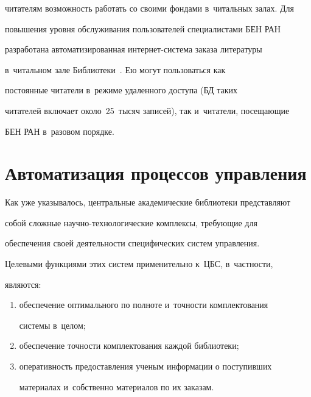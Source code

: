 читателям возможность работать со своими фондами в~читальных залах. Для 


повышения уровня обслуживания пользователей специалистами БЕН РАН 


разработана автоматизированная ин\-тер\-нет-сис\-те\-ма заказа литературы 


в~читальном зале Библиотеки~\cite{21-vla}. Ею могут пользоваться как 


постоянные читатели в~режиме удаленного доступа (БД таких 


читателей включает около~25~тысяч записей), так и~читатели, посещающие 


БЕН РАН в~разовом порядке. 


  


\section{Автоматизация процессов управления}





  Как уже указывалось, центральные академические библиотеки представляют 


собой сложные на\-уч\-но-тех\-но\-ло\-ги\-че\-ские комплексы, требующие для 


обеспечения своей деятельности специфических систем управления.


  


  Целевыми функциями этих систем применительно к~ЦБС, в~частности, 


являются: 


  \begin{enumerate}[(1)]


  \item  обеспечение оптимального по полноте и~точности комплектования 


системы в~целом; 


  \item обеспечение точности комплектования каждой библиотеки;


  \item оперативность предоставления ученым информации о поступивших 


материалах и~собственно материалов по их заказам.


  \end{enumerate}


  



